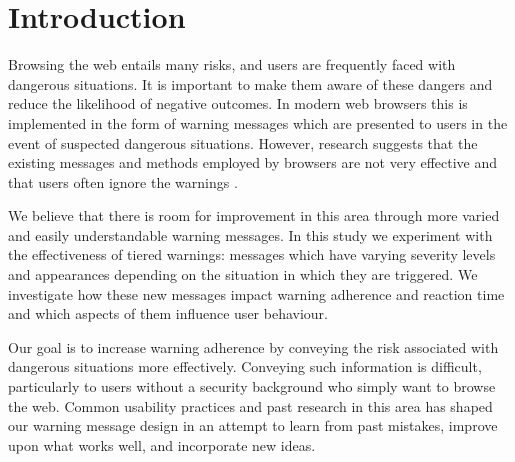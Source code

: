 \chapter{Introduction}
\label{Introduction}

Browsing the web entails many risks, and users are frequently faced with dangerous situations. It is important to make them aware of these dangers and reduce the likelihood of negative outcomes. In modern web browsers this is implemented in the form of warning messages which are presented to users in the event of suspected dangerous situations. However, research suggests that the existing messages and methods employed by browsers are not very effective and that users often ignore the warnings \cite{akhawe2013alice, almuhimedi2014reputation, anderson2015polymorphic, bravo2011bridging, dhamija2006phishing, egelman2008warned, sunshine2009crying}.

We believe that there is room for improvement in this area through more varied and easily understandable warning messages. In this study we experiment with the effectiveness of tiered warnings: messages which have varying severity levels and appearances depending on the situation in which they are triggered. We investigate how these new messages impact warning adherence and reaction time and which aspects of them influence user behaviour.

Our goal is to increase warning adherence by conveying the risk associated with dangerous situations more effectively. Conveying such information is difficult, particularly to users without a security background who simply want to browse the web. Common usability practices and past research in this area has shaped our warning message design in an attempt to learn from past mistakes, improve upon what works well, and incorporate new ideas.

